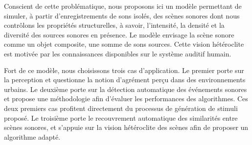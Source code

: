 Conscient de cette problématique, nous proposons ici un modèle permettant de simuler, à partir d'enregistrements de sons isolés, des scènes sonores dont nous contrôlons les propriétés structurelles, à savoir, l'intensité, la densité et la diversité des sources sonores en présence. Le modèle envisage la scène sonore comme un objet composite, une somme de sons sources. Cette vision hétéroclite est motivée par les connaissances disponibles sur le système auditif humain.

Fort de ce modèle, nous choisissons trois cas d'application. Le premier porte sur la perception et questionne la notion d'agrément perçu dans des environnements urbains. Le deuxième porte sur la détection automatique des événements sonores et propose une méthodologie afin d'évaluer les performances des algorithmes. Ces deux premiers cas profitent directement du processus de génération de stimuli proposé. Le troisième porte le recouvrement automatique des similarités entre scènes sonores, et s'appuie sur la vision hétéroclite des scènes afin de proposer un algorithme adapté.

\endgroup			

\vfill